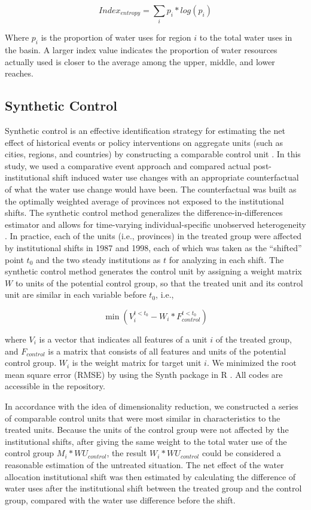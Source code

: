 \documentclass{../nsr}
\begin{document}
$$ Index_{entropy} = \sum_i{p_i *log(p_i)} $$

Where $p_i$ is the proportion of water uses for region $i$ to the total water uses in the basin. A larger index value indicates the proportion of water resources actually used is closer to the average among the upper, middle, and lower reaches.

\subsection{Synthetic Control}
Synthetic control is an effective identification strategy for estimating the net effect of historical events or policy interventions on aggregate units (such as cities, regions, and countries) by constructing a comparable control unit \cite{abadieSyntheticControlMethods2010}.
In this study, we used a comparative event approach and compared actual post-institutional shift induced water use changes with an appropriate counterfactual of what the water use change would have been.
The counterfactual was built as the optimally weighted average of provinces not exposed to the institutional shifts.
The synthetic control method generalizes the difference-in-differences estimator and allows for time-varying individual-specific unobserved heterogeneity \cite{billmeierAssessingEconomicLiberalization2013, smithresourcecurseexorcised2015}.
In practice, each of the units (i.e., provinces) in the treated group were affected by institutional shifts in 1987 and 1998, each of which was taken as the “shifted” point $t_0$ and the two steady institutions as $t$ for analyzing in each shift. The synthetic control method generates the control unit by assigning a weight matrix $W$ to units of the potential control group, so that the treated unit and its control unit are similar in each variable before $t_0$, i.e.,

$$\min(V_{i}^{t<t_0} - W_i * F_{control}^{t<t_0})$$

where $V_i$ is a vector that indicates all features of a unit $i$ of the treated group, and $F_{control}$ is a matrix that consists of all features and units of the potential control group. $W_i$ is the weight matrix for target unit $i$. We minimized the root mean square error (RMSE) by using the Synth package in R \cite{abadieSynthPackageSynthetic2011, abadieComparativePoliticsSynthetic2015}. All codes are accessible in the repository.

In accordance with the idea of dimensionality reduction, we constructed a series of comparable control units that were most similar in characteristics to the treated units. Because the units of the control group were not affected by the institutional shifts, after giving the same weight to the total water use of the control group $M_i * WU_{control}$, the result $W_i*WU_{control}$ could be considered a reasonable estimation of the untreated situation. The net effect of the water allocation institutional shift was then estimated by calculating the difference of water uses after the institutional shift between the treated group and the control group, compared with the water use difference before the shift.
\end{document}
